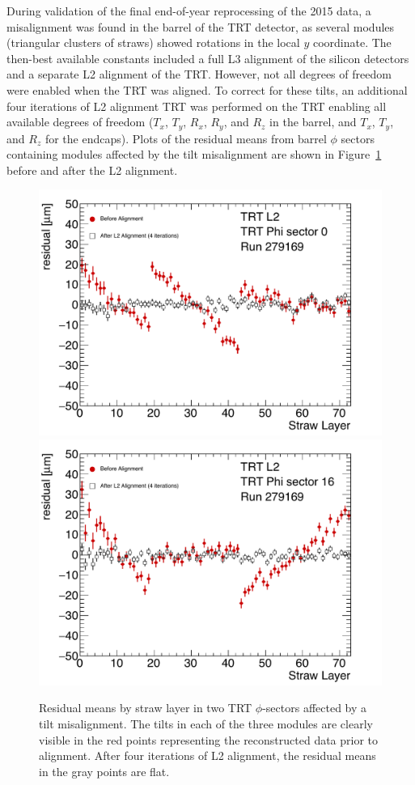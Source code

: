 During validation of the final end-of-year reprocessing of the 2015 data, a misalignment was found in the barrel of the TRT detector, as several modules (triangular clusters of straws) showed rotations in the local $y$ coordinate.
The then-best available constants included a full L3 alignment of the silicon detectors and a separate L2 alignment of the TRT.
However, not all degrees of freedom were enabled when the TRT was aligned.
To correct for these tilts, an additional four iterations of L2 alignment TRT was performed on the TRT enabling all available degrees of freedom ($T_x$, $T_y$, $R_x$, $R_y$, and $R_z$ in the barrel, and $T_x$, $T_y$, and $R_z$ for the endcaps).
Plots of the residual means from barrel $\phi$ sectors containing modules affected by the tilt misalignment are shown in Figure~\ref{fig:align_trt_l2} before and after the L2 alignment.

\begin{figure}[htbp]
  \centering
  \includegraphics[width=.48\textwidth]{figs/alignment/trt/TRT_aveResVsStrawLayerModule0}
  \includegraphics[width=.48\textwidth]{figs/alignment/trt/TRT_aveResVsStrawLayerModule16}
  \caption{Residual means by straw layer in two TRT $\phi$-sectors affected by a tilt misalignment.  The tilts in each of the three modules are clearly visible in the red points representing the reconstructed data prior to alignment.  After four iterations of L2 alignment, the residual means in the gray points are flat.}
  \label{fig:align_trt_l2}
\end{figure}

